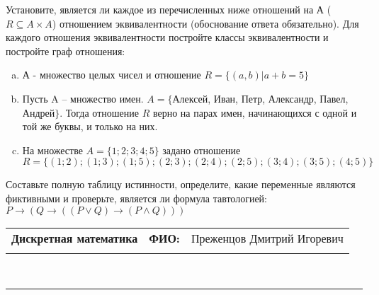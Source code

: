 \documentclass[10pt]{exam}
\newcommand{\class}{Дискретная математика}
\newcommand{\examdate}{}
\begin{document}
\begin{questions}
\question
Установите, является ли каждое из перечисленных ниже отношений на А ($R \subseteq A \times A$) отношением эквивалентности (обоснование ответа обязательно). Для каждого отношения эквивалентности постройте классы 
эквивалентности и постройте граф отношения:
\begin{enumerate} [a)]\setcounter{enumi}{0}
\item А - множество целых чисел и отношение $R = \{(a,b)|a + b = 5\}$
\item Пусть A – множество имен. $A = \{ $Алексей, Иван, Петр, Александр, Павел, Андрей$ \}$. Тогда отношение $R $ верно на парах имен, начинающихся с одной и той же буквы, и только на них.
\item На множестве $A = \{1; 2; 3; 4; 5\}$ задано отношение $R = \{(1; 2); (1; 3); (1; 5); (2; 3); (2; 4); (2; 5); (3; 4); (3; 5); (4; 5)\}$
\end{enumerate}\question Составьте полную таблицу истинности, определите, какие переменные являются фиктивными и проверьте, является ли формула тавтологией:
$ P \rightarrow (Q \rightarrow ((P \lor Q) \rightarrow (P \land Q)))$

\end{questions}
\newpage
\begin{flushright}
\begin{tabular}{p{2.8in} r l}
\textbf{\class} & \textbf{ФИО:} &Преженцов Дмитрий Игоревич
\\

\textbf{\examdate} &&\\
\end{tabular}\\
\end{flushright}
\rule[1ex]{\textwidth}{.1pt}
\end{document}
